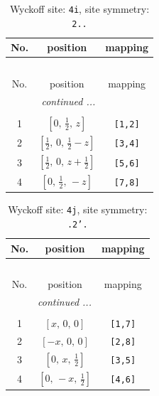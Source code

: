 \documentclass[fleqn,8pt]{jsarticle}
\begin{document}
\renewcommand{\arraystretch}{1.2}
\begin{longtable}{ccc}
\caption{Wyckoff site: {\tt 4i}, site symmetry: {\tt 2..}}
 \\
 \hline \hline
No. & position & mapping \\ \hline \endfirsthead

\multicolumn{2}{l}{\tablename\ \thetable{}} \\
 \hline \hline
No. & position & mapping \\ \hline \endhead

 \hline \hline
\multicolumn{2}{r}{\footnotesize\it continued ...} \\ \endfoot

 \hline \hline
\multicolumn{2}{r}{} \\ \endlastfoot

1 & $\left[ 0,\, \frac{1}{2},\, z \right]$ & {\tt [1,2]} \\ \hline
2 & $\left[ \frac{1}{2},\, 0,\, \frac{1}{2} - z \right]$ & {\tt [3,4]} \\ \hline
3 & $\left[ \frac{1}{2},\, 0,\, z + \frac{1}{2} \right]$ & {\tt [5,6]} \\ \hline
4 & $\left[ 0,\, \frac{1}{2},\, - z \right]$ & {\tt [7,8]} \\
\end{longtable}
\renewcommand{\arraystretch}{1.2}
\begin{longtable}{ccc}
\caption{Wyckoff site: {\tt 4j}, site symmetry: {\tt .2'.}}
 \\
 \hline \hline
No. & position & mapping \\ \hline \endfirsthead

\multicolumn{2}{l}{\tablename\ \thetable{}} \\
 \hline \hline
No. & position & mapping \\ \hline \endhead

 \hline \hline
\multicolumn{2}{r}{\footnotesize\it continued ...} \\ \endfoot

 \hline \hline
\multicolumn{2}{r}{} \\ \endlastfoot

1 & $\left[ x,\, 0,\, 0 \right]$ & {\tt [1,7]} \\ \hline
2 & $\left[ - x,\, 0,\, 0 \right]$ & {\tt [2,8]} \\ \hline
3 & $\left[ 0,\, x,\, \frac{1}{2} \right]$ & {\tt [3,5]} \\ \hline
4 & $\left[ 0,\, - x,\, \frac{1}{2} \right]$ & {\tt [4,6]} \\
\end{longtable}
\end{document}
